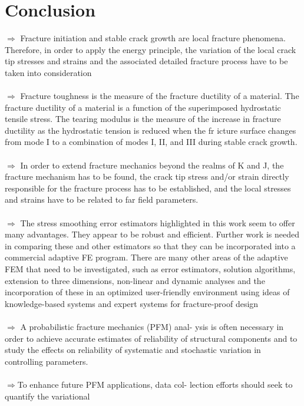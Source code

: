 \documentclass[12pt]{article}
\begin{document}
\section{Conclusion}
$\Rightarrow$ Fracture initiation and stable crack growth are local fracture phenomena. Therefore, in order to
apply the energy principle, the variation of the local crack tip stresses and strains and the associated
detailed fracture process have to be taken into consideration
\\\\$\Rightarrow$ Fracture toughness is the measure of the fracture ductility of a material. The fracture ductility of
a material is a function of the superimposed hydrostatic tensile stress. The tearing modulus is the
measure of the increase in fracture ductility as the hydrostatic tension is reduced when the fr icture
surface changes from mode I to a combination of modes I, II, and III during stable crack growth.
\\\\$\Rightarrow$ In order to extend fracture mechanics beyond the realms of K and J, the fracture mechanism has
to be found, the crack tip stress and/or strain directly responsible for the fracture process has to be
established, and the local stresses and strains have to be related to far field parameters.
\\\\$\Rightarrow$ The stress smoothing error estimators highlighted in this work seem to offer many advantages.
They appear to be robust and efficient. Further work is needed in comparing these and other
estimators so that they can be incorporated into a commercial adaptive FE program.
There are many other areas of the adaptive FEM that need to be investigated, such as error
estimators, solution algorithms, extension to three dimensions, non-linear and dynamic analyses
and the incorporation of these in an optimized user-friendly environment using ideas of
knowledge-based systems and expert systems for fracture-proof design
\\\\$\Rightarrow$ A probabilistic fracture mechanics (PFM) anal-
ysis is often necessary in order to achieve accurate
estimates of reliability of structural components and
to study the effects on reliability of systematic and
stochastic variation in controlling parameters.
\\\\$\Rightarrow$To enhance future PFM applications, data col-
lection efforts should seek to quantify the variational
\end{document}
